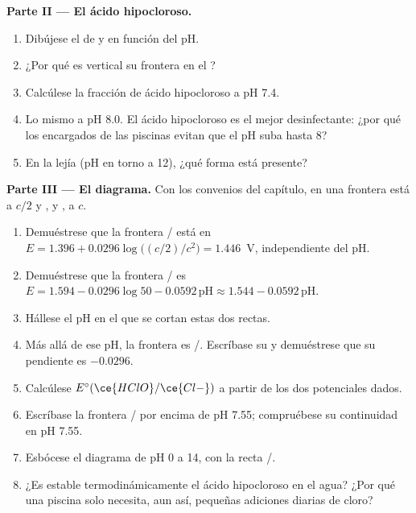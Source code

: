\begin{problem}
\medskip
\noindent\textbf{Parte II --- El ácido hipocloroso.}
\begin{enumerate}[resume]
  \item Dibújese el  de  y  en
        función del pH.
  \item ¿Por qué es vertical su frontera en el ?
  \item Calcúlese la fracción de ácido hipocloroso a pH 7.4.
  \item Lo mismo a pH 8.0. El ácido hipocloroso es el mejor
        desinfectante: ¿por qué los encargados de las piscinas evitan que
        el pH suba hasta 8?
  \item En la lejía (pH en torno a 12), ¿qué forma está presente?
\end{enumerate}

\medskip
\noindent\textbf{Parte III --- El diagrama.}
Con los convenios del capítulo, en una frontera  está a $c/2$
y ,  y , a $c$.
\begin{enumerate}[resume]
  \item Demuéstrese que la frontera / está en $E = 1.396 +
        0.0296\log\bigl((c/2)/c^2\bigr) = 1.446$~V, independiente del pH.
  \item Demuéstrese que la frontera / es $E = 1.594 -
        0.0296\log 50 - 0.0592\,\mathrm{pH} \approx 1.544 -
        0.0592\,\mathrm{pH}$.
  \item Hállese el pH en el que se cortan estas dos rectas.
  \item Más allá de ese pH, la frontera es /. Escríbase su
         y demuéstrese que su pendiente es $-0.0296$.
  \item Calcúlese $E^\circ(\ce{HClO}/\ce{Cl-})$ a partir de los dos
        potenciales dados.
  \item Escríbase la frontera / por encima de pH 7.55;
        compruébese su continuidad en pH 7.55.
  \item Esbócese el diagrama de pH 0 a 14, con la recta /.
  \item ¿Es estable termodinámicamente el ácido hipocloroso en el agua?
        ¿Por qué una piscina solo necesita, aun así, pequeñas adiciones
        diarias de cloro?
\end{enumerate}


\end{problem}
